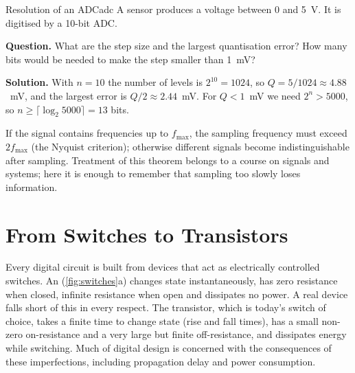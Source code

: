 
\begin{example}{Resolution of an ADC}{adc}
A sensor produces a voltage between 0 and 5~V. It is digitised by a 10-bit ADC.

\textbf{Question.} What are the step size and the largest quantisation error? How many bits would be needed to make the step smaller than 1~mV?

\textbf{Solution.} With $n=10$ the number of levels is $2^{10}=1024$, so $Q = 5/1024 \approx 4.88$~mV, and the largest error is $Q/2 \approx 2.44$~mV. For $Q<1$~mV we need $2^n > 5000$, so $n \ge \lceil \log_2 5000 \rceil = 13$ bits.
\end{example}

\begin{keypoint}
If the signal contains frequencies up to $f_{\max}$, the sampling frequency must exceed $2f_{\max}$ (the Nyquist criterion); otherwise different signals become indistinguishable after sampling. Treatment of this theorem belongs to a course on signals and systems; here it is enough to remember that sampling too slowly loses information.
\end{keypoint}

\section{From Switches to Transistors}\label{sec:switches}
Every digital circuit is built from devices that act as electrically controlled switches. An  (\cref{fig:switches}a) changes state instantaneously, has zero resistance when closed, infinite resistance when open and dissipates no power. A real device falls short of this in every respect. The transistor, which is today's switch of choice, takes a finite time to change state (rise and fall times), has a small non-zero on-resistance and a very large but finite off-resistance, and dissipates energy while switching. Much of digital design is concerned with the consequences of these imperfections, including propagation delay and power consumption.

